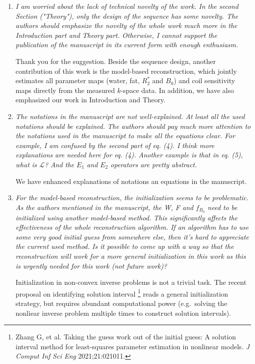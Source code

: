\documentclass[a4paper,11pt]{report}
\begin{document}
\begin{enumerate}
	\item \textit{I am worried about the lack of technical novelty of the work. In the second Section ("Theory"), only the design of the sequence has some novelty. The authors should emphasize the novelty of the whole work much more in the Introduction part and Theory part. Otherwise, I cannot support the publication of the manuscript in its current form with enough enthusiasm.}

\hspace{1em} Thank you for the suggestion. Beside the sequence design, 
another contribution of this work is the model-based reconstruction, 
which jointly estimates all parameter maps (water, fat, $R_2^*$ and $B_0$) and 
coil sensitivity maps directly from the measured $k$-space data. 
In addition, we have also emphasized our work in Introduction and Theory.

	\item \textit{The notations in the manuscript are not well-explained. At least all the used notations should be explained. The authors should pay much more attention to the notations used in the manuscript to make all the equations clear. For example, I am confused by the second part of eq. (4). I think more explanations are needed here for eq. (4). Another example is that in eq. (5), what is $\mathcal{L}$? And the $E_1$ and $E_2$ operators are pretty abstract.}

\hspace{1em} We have enhanced explanations of notations an equations in the manuscript.

	\item \textit{For the model-based reconstruction, the initialization seems to be problematic. As the authors mentioned in the manuscript, the W, F and $f_{B_0}$ need to be initialized using another model-based method. This significantly affects the effectiveness of the whole reconstruction algorithm. If an algorithm has to use some very good initial guess from somewhere else, then it's hard to appreciate the current used method. Is it possible to come up with a way so that the reconstruction will work for a more general initialization in this work as this is urgently needed for this work (not future work)?}

\hspace{1em} Initialization in non-convex inverse problems is not a trivial task. 
The recent proposal on identifying solution interval 
\footnote{Zhang G, et al. Taking the guess work out of the initial guess: A solution interval method for least-squares parameter estimation in nonlinear models. \textit{J Comput Inf Sci Eng} 2021;21:021011.}
reads a general initialization strategy, but requires abundant computational power 
(e.g.~solving the nonliear inverse problem multiple times to construct solution intervals).


\end{enumerate}
\end{document}
